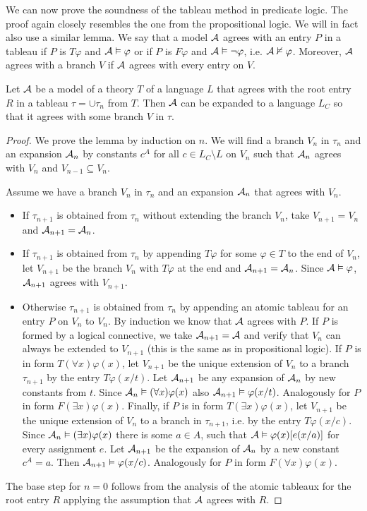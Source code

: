 We can now prove the soundness of the tableau method in predicate logic. The proof again closely resembles the one from the propositional logic. We will in fact also use a similar lemma. We say that a model $\mathcal{A}$ agrees with an entry $P$ in a tableau if $P$ is $T \varphi$ and $\mathcal{A} \vDash \varphi$ or if $P$ is $F \varphi$ and $\mathcal{A} \vDash \neg \varphi$, i.e. $\mathcal{A} \nvDash \varphi$. Moreover, $\mathcal{A}$ agrees with a branch $V$ if $\mathcal{A}$ agrees with every entry on $V$.

\begin{lemma}
Let $\mathcal{A}$ be a model of a theory $T$ of a language $L$ that agrees with the root entry $R$ in a tableau $\tau = \cup \tau_n$ from $T$. Then $\mathcal{A}$ can be expanded to a language $L_C$ so that it agrees with some branch $V$ in $\tau$.
\end{lemma}
\begin{proof}
We prove the lemma by induction on $n$. We will find a branch $V_n$ in $\tau_n$ and an expansion $\mathcal{A}_n$ by constants $c^A$ for all $c \in L_C \setminus L$ on $V_n$ such that $\mathcal{A}_n$ agrees with $V_n$ and $V_{n-1} \subseteq V_{n}$.

Assume we have a branch $V_n$ in $\tau_n$ and an expansion $\mathcal{A}_n$ that agrees with $V_n$.
\begin{itemize}
	\item If $\tau_{n+1}$ is obtained from $\tau_n$ without extending the branch $V_n$, take $V_{n+1}=V_n$ and $\mathcal{A}_{n+1}=\mathcal{A}_n$.
	\item If $\tau_{n+1}$ is obtained from $\tau_n$ by appending $T \varphi$ for some $\varphi \in T$ to the end of $V_n$, let $V_{n+1}$ be the branch $V_n$ with $T \varphi$ at the end and $\mathcal{A}_{n+1} = \mathcal{A}_n$. Since $\mathcal{A} \vDash \varphi$, $\mathcal{A}_{n+1}$ agrees with $V_{n+1}$.
	\item Otherwise $\tau_{n+1}$ is obtained from $\tau_n$ by appending an atomic tableau for an entry $P$ on $V_n$ to $V_n$. By induction we know that $\mathcal{A}$ agrees with $P$. If $P$ is formed by a logical connective, we take $\mathcal{A}_{n+1}=\mathcal{A}$ and verify that $V_n$ can always be extended to $V_{n+1}$ (this is the same as in propositional logic). If $P$ is in form $T(\forall x)\varphi(x)$, let $V_{n+1}$ be the unique extension of $V_n$ to a branch $\tau_{n+1}$ by the entry $T \varphi(x/t)$. Let $\mathcal{A}_{n+1}$ be any expansion of $\mathcal{A}_n$ by new constants from $t$. Since $\mathcal{A}_n \vDash (\forall x) \varphi(x)$ also $\mathcal{A}_{n+1} \vDash \varphi(x/t)$. Analogously for $P$ in form $F(\exists x) \varphi(x)$. Finally, if $P$ is in form $T(\exists x) \varphi(x)$, let $V_{n+1}$ be the unique extension of $V_n$ to a branch in $\tau_{n+1}$, i.e. by the entry $T \varphi(x/c)$. Since $\mathcal{A}_n \vDash (\exists x) \varphi(x)$ there is some $a \in A$, such that $\mathcal{A} \vDash \varphi(x)[e(x/a)]$ for every assignment $e$. Let $\mathcal{A}_{n+1}$ be the expansion of $\mathcal{A}_n$ by a new constant $c^A = a$. Then $\mathcal{A}_{n+1} \vDash \varphi(x/c)$. Analogously for $P$ in form $F (\forall x)\varphi(x)$.
\end{itemize}
The base step for $n=0$ follows from the analysis of the atomic tableaux for the root entry $R$ applying the assumption that $\mathcal{A}$ agrees with $R$.
\end{proof}

